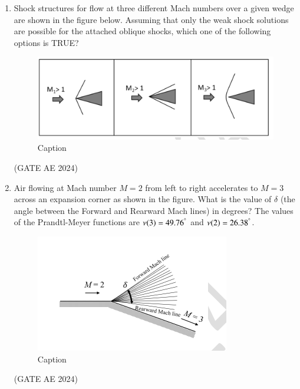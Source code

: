 \documentclass[journal,12pt,onecolumn]{IEEEtran}
\theoremstyle{remark}
\begin{document}
\begin{enumerate}
\item Shock structures for flow at three different Mach numbers over a given wedge are shown in the figure below. Assuming that only the weak shock solutions are possible for the attached oblique shocks, which one of the following options is TRUE?  
\begin{figure}[H]
    \centering
    \includegraphics[width=0.5\columnwidth]{figs/Screenshot 2025-08-24 060230.png}
    \caption{Caption}
    \label{fig:placeholder}
\end{figure}
\begin{enumerate}
\end{enumerate}
\hfill(GATE AE 2024)


\item Air flowing at Mach number $M = 2$ from left to right accelerates to $M = 3$ across an expansion corner as shown in the figure. What is the value of $\delta$ (the angle between the Forward and Rearward Mach lines) in degrees? The values of the Prandtl-Meyer functions are $\nu(3) = 49.76^\degree$ and $\nu(2) = 26.38^\degree$.  
\begin{figure}[H]
    \centering
    \includegraphics[width=0.5\columnwidth]{figs/Screenshot 2025-08-24 060809.png}
    \caption{Caption}
    \label{fig:placeholder}
\end{figure}
\begin{enumerate}
\end{enumerate}
\hfill(GATE AE 2024)


\end{enumerate}
\end{document}
